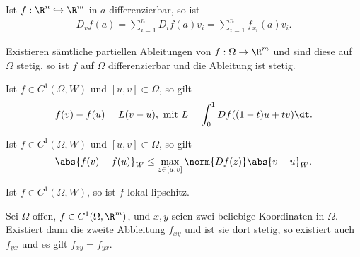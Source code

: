 \begin{prop}
Ist $f:\R^n\hookrightarrow\R^m$ in $a$ differenzierbar, so ist
\begin{align*}
D_vf(a) = \sum\limits_{i=1}^n D_if(a)v_i = \sum\limits_{i=1}^n
f_{x_i}(a)v_i.
\end{align*}
\end{prop}
\begin{prop}
Existieren sämtliche partiellen Ableitungen von $f: \Omega\to\R^m$ und sind
diese auf $\Omega$ stetig, so ist $f$ auf $\Omega$ differenzierbar und die
Ableitung ist stetig.
\end{prop}
\begin{prop}
Ist $f \in C^1(\Omega,W)$ und $[u,v]\subset\Omega$, so gilt
\begin{align*}
f(v)-f(u) = L(v-u), \text{ mit } L = \int_{0}^1 Df((1-t)u
+tv)\dt.
\end{align*}
\end{prop}
\begin{prop}[Schrankensatz]
Ist $f \in C^1(\Omega,W)$ und $[u,v]\subset\Omega$, so gilt
\begin{align*}
\abs{f(v)-f(u)}_W \le \max\limits_{z\in[u,v]}\norm{Df(z)}\abs{v-u}_W.
\end{align*}
\end{prop}
\begin{prop}
Ist $f \in C^1(\Omega,W)$, so ist $f$ lokal lipschitz.
\end{prop}
\begin{prop}
Sei $\Omega$ offen, $f\in C^1(\Omega,\R^m)$, und $x,y$ seien zwei beliebige
Koordinaten in $\Omega$. Existiert dann die zweite Abbleitung $f_{xy}$ und ist
sie dort stetig, so existiert auch $f_{yx}$ und es gilt $f_{xy} = f_{yx}$.
\end{prop}

